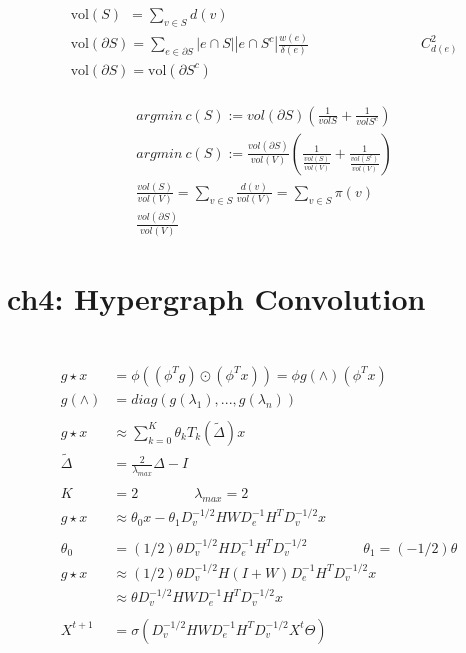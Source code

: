 \documentclass{article}
\begin{document}
%
\begin{align*}
    & \text{vol}(S) \ \ = \sum_{v \in S} d(v)  \\[3pt]
    & \text{vol}(\partial S) = \sum_{e \in \partial S} 
      |e \cap S||e \cap S^{c}| \frac{w(e)}{\delta (e)} 
      \qquad \qquad \qquad \qquad C_{d(e)}^{2}  \\[3pt]
    & \text{vol}(\partial S) = \text{vol}(\partial S^{c})  \\[3pt]
\end{align*}


%
\begin{align*}
    & argmin \ c(S) := vol(\partial S) (\frac{1}{volS} + \frac{1}{volS^{c}})  \\[3pt]
    & argmin \ c(S) := \frac{vol(\partial S)}{vol(V)} 
    (\frac{1}{ \frac{vol(S)}{vol(V)} } + 
     \frac{1}{ \frac{vol(S^{c})}{vol(V)} })  \\[3pt]
    & \frac{vol(S)}{vol(V)} 
      = \sum_{v \in S} \frac{d(v)}{vol(V)} 
      = \sum_{v \in S} \pi (v)  \\[3pt]
    & \frac{vol(\partial S)}{vol(V)} 
\end{align*}


\newpage
\section*{ch4: Hypergraph Convolution}


~ \\[3pt]
%
\begin{align*}
    ~ \\[3pt]
    g \star x &= \phi ( (\phi^{T} g) \odot (\phi^{T} x) ) 
              = \phi g(\wedge) (\phi^{T} x)  \\[3pt]
    g(\wedge) &= diag( g(\lambda_{1}), ..., g(\lambda_{n}) )  \\[3pt]
    ~ \\[3pt]
    g \star x & \approx \sum_{k=0}^{K} \theta_{k} T_{k} ( \tilde{\Delta} ) x  \\[3pt]
    \tilde{\Delta} & = \frac{2}{\lambda_{max}} \Delta - I  \\[3pt]
    ~ \\[3pt]
    K & = 2  \qquad \qquad \lambda_{max} = 2  \\[3pt]
    g \star x & \approx \theta_{0}x - \theta_{1} 
        D_{v}^{-1/2} H W D_{e}^{-1} H^{T} D_{v}^{-1/2} x  \\[3pt]
    ~ \\[3pt]
    \theta_{0} &= (1/2) \theta D_{v}^{-1/2} H D_{e}^{-1} H^{T} D_{v}^{-1/2} \qquad \qquad 
    \theta_{1} = (-1/2) \theta  \\[3pt]
    g \star x & \approx (1/2) \theta D_{v}^{-1/2} H (I+W) D_{e}^{-1} H^{T} D_{v}^{-1/2} x  \\[3pt]
              & \approx \theta D_{v}^{-1/2} H W D_{e}^{-1} H^{T} D_{v}^{-1/2} x  \\[3pt]
    ~ \\[3pt]
    X^{t+1} &= \sigma ( D_{v}^{-1/2} H W D_{e}^{-1} H^{T} D_{v}^{-1/2} X^{t} \varTheta )  \\[3pt]
\end{align*}
\end{document}

